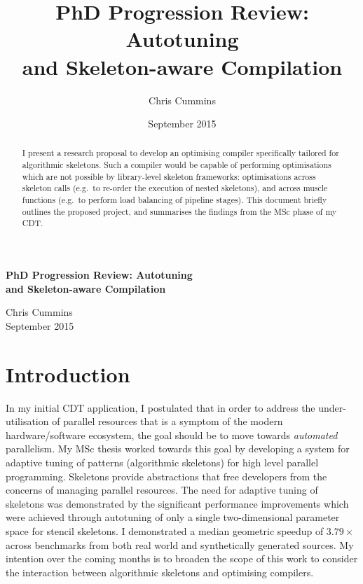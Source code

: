 \documentclass[11pt]{article}
\author{Chris Cummins}
\date{September 2015}
\title{PhD Progression Review: Autotuning\\and Skeleton-aware Compilation}
\begin{document}
  \begin{center}
    \Large
    \textbf{PhD Progression Review: Autotuning\\and Skeleton-aware Compilation}
    \vspace{0.2cm}

    \normalsize
    Chris Cummins\\
    September 2015
    \vspace{0.2cm}
  \end{center}

  \begin{abstract}
    \noindent
    I present a research proposal to develop an optimising compiler
    specifically tailored for algorithmic skeletons. Such a compiler would
    be capable of performing optimisations which are not possible by
    library-level skeleton frameworks: optimisations across skeleton calls
    (e.g.\ to re-order the execution of nested skeletons), and across
    muscle functions (e.g.\ to perform load balancing of pipeline
    stages). This document briefly outlines the proposed project, and
    summarises the findings from the MSc phase of my CDT.
  \end{abstract}

  \section{Introduction}

  In my initial CDT application, I postulated that in order to address
  the under-utilisation of parallel resources that is a symptom of the
  modern hardware/software ecosystem, the goal should be to move towards
  \emph{automated} parallelism. My MSc thesis worked towards this goal
  by developing a system for adaptive tuning of patterns (algorithmic
  skeletons) for high level parallel programming. Skeletons provide
  abstractions that free developers from the concerns of managing
  parallel resources. The need for adaptive tuning of skeletons was
  demonstrated by the significant performance improvements which were
  achieved through autotuning of only a single two-dimensional parameter
  space for stencil skeletons. I demonstrated a median geometric speedup
  of $3.79\times$ across benchmarks from both real world and
  synthetically generated sources. My intention over the coming months
  is to broaden the scope of this work to consider the interaction
  between algorithmic skeletons and optimising compilers.
\end{document}
